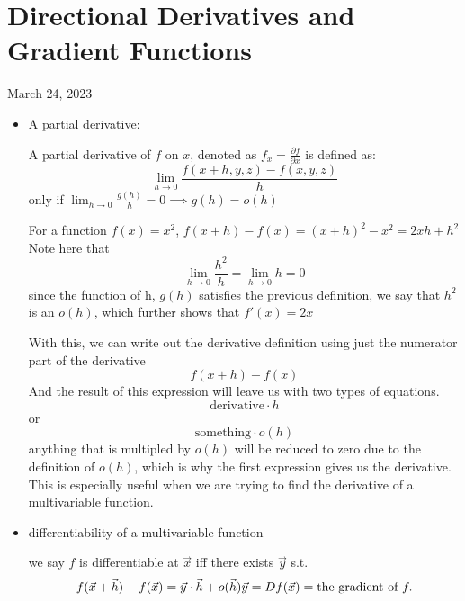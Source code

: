 \newpage
\section{Directional Derivatives and Gradient Functions}
March 24, 2023
\begin{itemize}
	\item A partial derivative:
		\begin{definition}
			A partial derivative of $f$ on $x$, denoted as $f_x = \frac{\partial f}{\partial x} $ is defined as:
			\begin{equation}
				\lim_{h \to 0} \frac{f\left( x+h, y, z \right) -f\left( x, y, z \right) }{h}
			\end{equation}
			only if $\lim_{h \to 0} \frac{g\left( h \right) }{h} = 0 \implies g\left( h \right)  = o\left( h \right) $
		\end{definition}
		\begin{example}
			For a function $f\left( x \right)  = x^2$, $f\left( x+h \right) -f(x) =  \left( x+h \right) ^2 - x^2 = 2xh + h^2$ 
		Note here that
		\begin{equation}
			\lim_{h \to 0} \frac{h^2}{h} = \lim_{h \to 0} h = 0
		\end{equation}
		since the function of h, $g\left( h \right)$ satisfies the previous definition, we say that $h^2$ is an $o\left( h \right) $, which further shows that $f'\left( x \right)  = 2x$
		\end{example}
		\begin{idea}
			With this, we can write out the derivative definition using just the numerator part of the derivative 
			\begin{equation}
				f\left( x+h \right)  - f\left( x \right) 
			\end{equation}
			And the result of this expression will leave us with two types of equations.
			\begin{equation}
				\text{derivative} \cdot  h
			\end{equation}
			or
			\begin{equation}
				\text{something} \cdot  o\left( h \right) 
			\end{equation}
			anything that is multipled by $o\left( h \right) $ will be reduced to zero due to the definition of $o\left( h \right) $, which is why the first expression gives us the derivative.\\
			This is especially useful when we are trying to find the derivative of a multivariable function. 
		\end{idea} 
	\item differentiability of a multivariable function
\begin{definition}
	we say $f$ is differentiable at $\vec{x}$ iff there exists $\vec{y}$ s.t. \[
	f(\vec{x}+\vec{h}) - f(\vec{x}) = \vec{y} \cdot \vec{h} + o(\vec{h})\\
	\vec{y} = Df(\vec{x}) = \text{the gradient of } f 
	.\] 
\end{definition}


\end{itemize}
